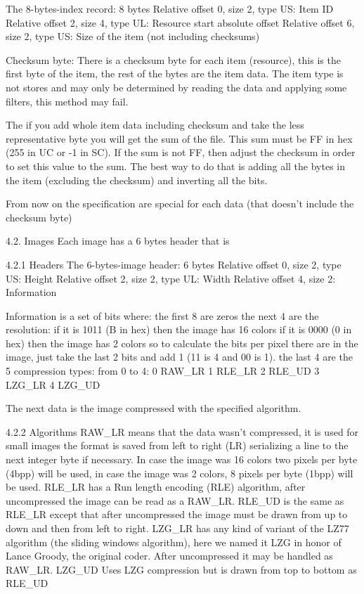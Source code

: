  The 8-bytes-index record: 8 bytes
  Relative offset 0, size 2, type US: Item ID
  Relative offset 2, size 4, type UL: Resource start absolute offset
  Relative offset 6, size 2, type US: Size of the item (not including
                                      checksums)

 Checksum byte:
 There is a checksum byte for each item (resource), this is the first byte
 of the item, the rest of the bytes are the item data. The item type is not
 stores and may only be determined by reading the data and applying some
 filters, this method may fail.

 The if you add whole item data including checksum and take the less
 representative byte you will get the sum of the file. This sum must be FF
 in hex (255 in UC or -1 in SC). If the sum is not FF, then adjust the
 checksum in order to set this value to the sum. The best way to do that is
 adding all the bytes in the item (excluding the checksum) and inverting
 all the bits.

 From now on the specification are special for each data (that doesn't
 include the checksum byte)

4.2. Images
 Each image has a 6 bytes header that is

4.2.1 Headers
 The 6-bytes-image header: 6 bytes
  Relative offset 0, size 2, type US: Height
  Relative offset 2, size 2, type UL: Width
  Relative offset 4, size 2: Information

 Information is a set of bits where:
  the first 8 are zeros
  the next 4 are the resolution:
   if it is 1011 (B in hex) then the image has 16 colors
   if it is 0000 (0 in hex) then the image has 2 colors
   so to calculate the bits per pixel there are in the image, just take the
   last 2 bits and add 1 (11 is 4 and 00 is 1).
  the last 4 are the 5 compression types:
   from 0 to 4:
   0 RAW_LR
   1 RLE_LR
   2 RLE_UD
   3 LZG_LR
   4 LZG_UD

 The next data is the image compressed with the specified algorithm.

4.2.2 Algorithms
 RAW_LR means that the data wasn't compressed, it is used for small images
        the format is saved from left to right (LR) serializing a line to
        the next integer byte if necessary. In case the image was 16 colors
        two pixels per byte (4bpp) will be used, in case the image was 2
        colors, 8 pixels per byte (1bpp) will be used.
 RLE_LR has a Run length encoding (RLE) algorithm, after uncompressed the
        image can be read as a RAW_LR.
 RLE_UD is the same as RLE_LR except that after uncompressed the image must
        be drawn from up to down and then from left to right.
 LZG_LR has any kind of variant of the LZ77 algorithm (the sliding windows
        algorithm), here we named it LZG in honor of Lance Groody, the
        original coder.
        After uncompressed it may be handled as RAW_LR.
 LZG_UD Uses LZG compression but is drawn from top to bottom as RLE_UD

